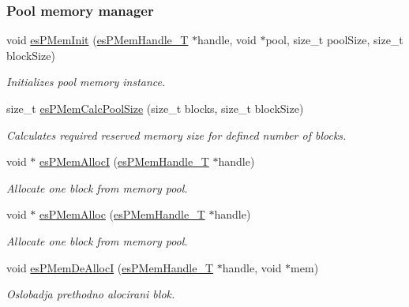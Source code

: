 \subsubsection*{Pool memory manager}
\begin{DoxyCompactItemize}
\item 
void \hyperlink{group__mem__intf_gac151cf4385488838b0507936e67e2584}{es\-P\-Mem\-Init} (\hyperlink{group__mem__intf_gaf82f01d26c4f6bc9a2b672a673b09ce2}{es\-P\-Mem\-Handle\-\_\-\-T} $\ast$handle, void $\ast$pool, size\-\_\-t pool\-Size, size\-\_\-t block\-Size)
\begin{DoxyCompactList}\small\item\em Initializes pool memory instance. \end{DoxyCompactList}\item 
size\-\_\-t \hyperlink{group__mem__intf_gab82743b6c82847c748bf5193f0f211ec}{es\-P\-Mem\-Calc\-Pool\-Size} (size\-\_\-t blocks, size\-\_\-t block\-Size)
\begin{DoxyCompactList}\small\item\em Calculates required reserved memory size for defined number of blocks. \end{DoxyCompactList}\item 
void $\ast$ \hyperlink{group__mem__intf_gabdacce602565fcd6a186c2834cb74488}{es\-P\-Mem\-Alloc\-I} (\hyperlink{group__mem__intf_gaf82f01d26c4f6bc9a2b672a673b09ce2}{es\-P\-Mem\-Handle\-\_\-\-T} $\ast$handle)
\begin{DoxyCompactList}\small\item\em Allocate one block from memory pool. \end{DoxyCompactList}\item 
void $\ast$ \hyperlink{group__mem__intf_gac750c9ec7780f5dc616e8a04a6668f34}{es\-P\-Mem\-Alloc} (\hyperlink{group__mem__intf_gaf82f01d26c4f6bc9a2b672a673b09ce2}{es\-P\-Mem\-Handle\-\_\-\-T} $\ast$handle)
\begin{DoxyCompactList}\small\item\em Allocate one block from memory pool. \end{DoxyCompactList}\item 
void \hyperlink{group__mem__intf_ga2c0f1b135c5639809b17dfe44e06f1b5}{es\-P\-Mem\-De\-Alloc\-I} (\hyperlink{group__mem__intf_gaf82f01d26c4f6bc9a2b672a673b09ce2}{es\-P\-Mem\-Handle\-\_\-\-T} $\ast$handle, void $\ast$mem)
\begin{DoxyCompactList}\small\item\em Oslobadja prethodno alocirani blok. \end{DoxyCompactList}\item 

\end{DoxyCompactItemize}
